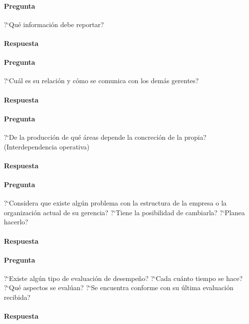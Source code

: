 \documentclass[12pt,a4paper,spanish]{article}
\begin{document}
	\paragraph{Pregunta}
	 ?`Qu\'e informaci\'on debe reportar?
	\paragraph{Respuesta}

	\paragraph{Pregunta}
	 ?`Cu\'al es su relaci\'on y c\'omo se comunica con los dem\'as gerentes?
	\paragraph{Respuesta}

	\paragraph{Pregunta}
	 ?`De la producci\'on de qu\'e \'areas depende la concreci\'on de la propia? (Interdependencia operativa)
	\paragraph{Respuesta}

	\paragraph{Pregunta}
	 ?`Considera que existe alg\'un problema con la estructura de la empresa o la organizaci\'on actual de su gerencia?  ?`Tiene la posibilidad de cambiarla?  ?`Planea hacerlo?
	\paragraph{Respuesta}

	\paragraph{Pregunta}
	 ?`Existe alg\'un tipo de evaluaci\'on de desempe\~{n}o?  ?`Cada cu\'anto tiempo se hace?  ?`Qu\'e aspectos se eval\'uan?  ?`Se encuentra conforme con su \'ultima evaluaci\'on recibida?
	\paragraph{Respuesta}
\end{document}
